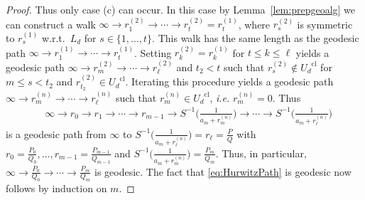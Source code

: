 \documentclass[10pt,a4paper]{amsart}
\begin{document}
\begin{proof}
Thus only case (c) can occur. In this case by Lemma~\ref{lem:prepgeoalg} we can construct a walk $\infty\to r_1^{(2)}\to \cdots\to r_t^{(2)}=r_t^{(1)}$, where $r_s^{(2)}$ is symmetric to $r_s^{(1)}$ w.r.t.\ $L_d$ for $s\in \{1,\ldots, t\}$. This walk has the same length as  the geodesic path $\infty\to r_1^{(1)}\to \cdots\to r_t^{(1)}$. Setting $r_k^{(2)}=r_k^{(1)}$ for $t \le k \le \ell$ yields a geodesic path $\infty \to r_m^{(2)}\to \cdots \to r_\ell^{(2)}$ and $t_2<t$ such that $r_s^{(2)} \not\in {U_{d}}^{\mathrm{cl}}$ for $m \leq s<t_2$ and $r_{t_2}^{(2)}\in {U_{d}}^{\mathrm{cl}}$. Iterating this procedure yields a geodesic path $\infty \to r_m^{(n)} \to \cdots \to r_\ell^{(n)}$ such that  $r_{m}^{(n)}\in{U_d}^{\mathrm{cl}}$, {\em i.e.} $r_m^{(n)}=0$. Thus
\[
\begin{split}
&\infty \to r_0 \to r_1 \to \cdots \to r_{m-1} \to S^{-1}\bigg(\frac1{a_m + r_m^{(n)}}\bigg)  \to  \cdots \to S^{-1}\bigg(\frac1{a_m + r_\ell^{(n)}}\bigg)
\end{split}
\]
is a  geodesic path from $\infty$ to $S^{-1}\bigg(\frac1{a_m + r_\ell^{(n)}}\bigg)=r_\ell=\frac PQ$ with $r_0=\frac {P_0}{Q_0},\ldots, r_{m-1}=\frac {P_{m-1}}{Q_{m-1}}$ and $S^{-1}\bigg(\frac1{a_m + r_m^{(n)}}\bigg)=\frac{P_m}{Q_m}$. Thus, in particular, $\infty \to \frac{P_0}{Q_0}\to\cdots\to \frac{P_{m}}{Q_{m}}$ is geodesic. The fact that \eqref{eq:HurwitzPath} is geodesic now follows by induction on $m$.
\end{proof}
\end{document}
